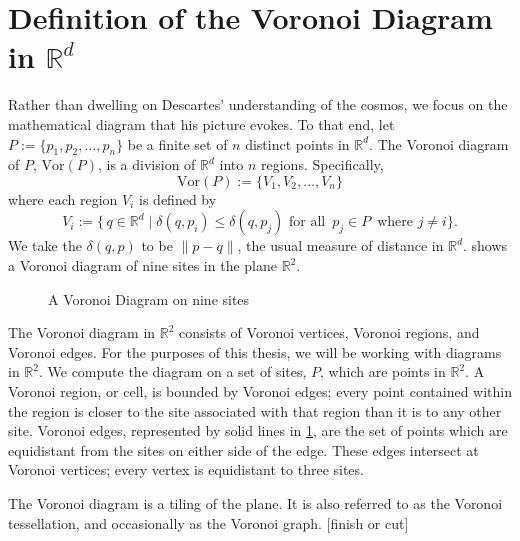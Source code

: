 \documentclass[12pt,twoside]{reedthesis}
\begin{document}
  \section{Definition of the Voronoi Diagram in $\mathds{R}^d$} %
  \label{sec:definition_of_the_voronoi_diagram_in_rd}
    Rather than dwelling on Descartes' understanding of the cosmos, we focus on the mathematical diagram that his picture evokes. To that end, let $P:=\{p_{1}, p_{2},\ldots, p_{n}\}$ be a finite set of $n$ distinct points in $\mathds{R}^d$. The Voronoi diagram of $P$, $\mbox{Vor}(P)$, is a division of $\mathds{R}^d$ into $n$ regions. Specifically, $$\mbox{Vor}(P):=\{V_{1}, V_{2}, \ldots, V_{n}\}$$ where each region $V_{i}$ is defined by 
    $$V_{i} := \{\,q \in \mathds{R}^d \mid \delta(q, p_{i}) \leq \delta(q, p_{j}) \text{ for all }\, p_{j}\in P\,\text{ where }j\neq i \}.$$ We take the $\delta(q, p)$ to be $\lVert p-q \rVert$, the usual measure of distance in $\mathds{R}^d$. 
      shows a Voronoi diagram of nine sites in the plane $\mathds{R}^2$.\par

    \begin{figure}[!htb]
      \centering
      
      \caption{A Voronoi Diagram on nine sites}
      \label{fig:first_sight}
    \end{figure} 

    The Voronoi diagram in $\mathds{R}^2$ consists of Voronoi vertices, Voronoi regions, and Voronoi edges. For the purposes of this thesis, we will be working with diagrams in $\mathds{R}^2$. We compute the diagram on a set of sites, $P$, which are points in $\mathds{R}^2$. A Voronoi region, or cell, is bounded by Voronoi edges; every point contained within the region is closer to the site associated with that region than it is to any other site. Voronoi edges, represented by solid lines in \cref{fig:first_sight}, are the set of points which are equidistant from the sites on either side of the edge. These edges intersect at Voronoi vertices; every vertex is equidistant to three sites.\par 

    The Voronoi diagram is a tiling of the plane. It is also referred to as the Voronoi tessellation, and occasionally as the Voronoi graph.  [finish or cut]
  
\end{document}
